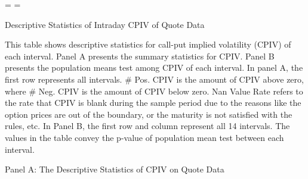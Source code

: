 

\newpage
{}%
\recalctypearea
\pdfpageheight=\paperheight
\pdfpagewidth=\paperwidth

\begin{table}[h]

\caption{Descriptive Statistics of Intraday CPIV of Quote Data}\label{table:stats_of_CPIV}
\begin{threeparttable}

\medskip


{\footnotesize 
This table shows descriptive statistics for call-put implied volatility (CPIV) of each interval. Panel A presents the summary statistics for CPIV. Panel B presents the population means test among CPIV of each interval. In panel A, the first row represents all intervals.  \# Pos. CPIV is the amount of CPIV above zero, where \# Neg. CPIV is the amount of CPIV below zero. Nan Value Rate refers to the rate that CPIV is blank during the sample period due to the reasons like the option prices are out of the boundary, or the maturity is not satisfied with the rules, etc. In Panel B, the first row and column represent all 14 intervals. The values in the table convey the p-value of population mean test between each interval. 
}


\begin{subtable}[t]{\linewidth}

\caption{Panel A: The Descriptive Statistics of CPIV on Quote Data }
\footnotesize


\end{subtable}
\end{threeparttable}
\end{table}
